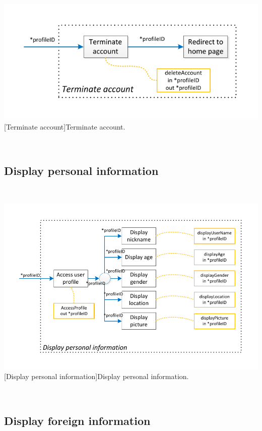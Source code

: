 \documentclass[11pt, a4paper,svglistings,oneside]{book}
\begin{document}
$\;$ \\
\noindent\begin{minipage}{\textwidth}
    \centering
   \includegraphics[scale=1]{nav_TerminateAccount.pdf}
 [Terminate account]{Terminate account.}
\end{minipage}
$\;$ \\ 

\subsection{Display personal information}

$\;$ \\
\noindent\begin{minipage}{\textwidth}
    \centering
   \includegraphics[scale=1]{Nav_DisplayPersonalInformation.pdf}
 [Display personal information]{Display personal information.}
\end{minipage}
$\;$ \\ 

\subsection{Display foreign information}
\end{document}
